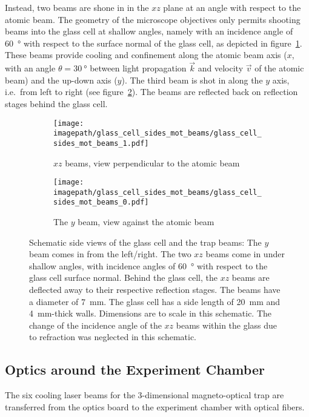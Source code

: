 Instead, two beams are shone in in the $xz$ plane at an angle with respect to the atomic beam. The geometry of the microscope objectives only permits shooting beams into the glass cell at shallow angles, namely with an incidence angle of \SI{60}{\degree} with respect to the surface normal of the glass cell, as depicted in figure~\ref{fig:glass_cell_sides_mot_beams_0}. These beams provide cooling and confinement along the atomic beam axis ($x$, with an angle $\theta = \SI{30}{\degree}$ between light propagation $\vec k$ and velocity $\vec v$ of the atomic beam) and the up-down axis ($y$). The third beam is shot in along the $y$ axis, i.e.\ from left to right (see figure~\ref{fig:glass_cell_sides_mot_beams_1}). The beams are reflected back on reflection stages behind the glass cell.

\begin{figure}
    \centering
    \begin{subfigure}[t]{0.7\textwidth}
        \centering
        \texttt{[image: \\imagepath/glass\_cell\_sides\_mot\_beams/glass\_cell\_sides\_mot\_beams\_1.pdf]}
        \caption{$xz$ beams, view perpendicular to the atomic beam}\label{fig:glass_cell_sides_mot_beams_0}
    \end{subfigure}
    \begin{subfigure}[t]{0.29\textwidth}
        \centering
        \texttt{[image: \\imagepath/glass\_cell\_sides\_mot\_beams/glass\_cell\_sides\_mot\_beams\_0.pdf]}
        \caption{The $y$ beam, view against the atomic beam}\label{fig:glass_cell_sides_mot_beams_1}
    \end{subfigure}
    \caption{Schematic side views of the glass cell and the trap beams: The $y$ beam comes in from the left/right. The two $xz$ beams come in under shallow angles, with incidence angles of \SI{60}{\degree} with respect to the glass cell surface normal. Behind the glass cell, the $xz$ beams are deflected away to their respective reflection stages. The beams have a diameter of \SI{7}{\milli\meter}. The glass cell has a side length of \SI{20}{\milli\meter} and \SI{4}{\milli\meter}-thick walls. Dimensions are to scale in this schematic. The change of the incidence angle of the $xz$ beams within the glass due to refraction was neglected in this schematic.}
    \label{fig:glass_cell_sides_mot_beams}
\end{figure} 

\subsection*{Optics around the Experiment Chamber}
The six cooling laser beams for the 3-dimensional magneto-optical trap are transferred from the optics board to the experiment chamber with optical fibers. 

